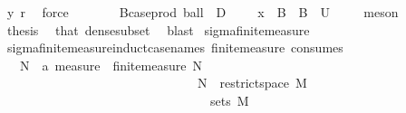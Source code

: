 \begin{isabellebody}
\ y{\isacharparenleft}{\kern0pt}{}{\isacharparenright}{\kern0pt}\ r\ \isamarkupfalse%
\ force\isanewline
\ \ \ \ \isamarkupfalse%
\ \isamarkupfalse%
\ {\isachardoublequoteopen}{\isasymexists}B{\isacharprime}{\kern0pt}{\isasymin}{\isacharparenleft}{\kern0pt}case{\isacharunderscore}{\kern0pt}prod\ ball\ {\isacharbackquote}{\kern0pt}\ {\isacharparenleft}{\kern0pt}D\ {\isasymtimes}\ {\isacharparenleft}{\kern0pt}{\isasymrat}\ {\isasyminter}\ {\isacharbraceleft}{\kern0pt}{}{\isacharless}{\kern0pt}{\isachardot}{\kern0pt}{\isachardot}{\kern0pt}{\isacharbraceright}{\kern0pt}{\isacharparenright}{\kern0pt}{\isacharparenright}{\kern0pt}{\isacharparenright}{\kern0pt}{\isachardot}{\kern0pt}\ x\ {\isasymin}\ B{\isacharprime}{\kern0pt}\ {\isasymand}\ B{\isacharprime}{\kern0pt}\ {\isasymsubseteq}\ U{\isachardoublequoteclose}\ \isamarkupfalse%
\ {\isacharasterisk}{\kern0pt}\ \isamarkupfalse%
\ meson\isanewline
\ \ \isamarkupfalse%
\isanewline
\ \ \isamarkupfalse%
\ {\isacharquery}{\kern0pt}thesis\ \isamarkupfalse%
\ that\ dense{\isacharunderscore}{\kern0pt}subset\ \isamarkupfalse%
\ blast\isanewline
{}\isamarkupfalse%
%
\endisatagproof
{\isafoldproof}%
%
\isadelimproof
\isanewline
%
\endisadelimproof
\isanewline
{}\isamarkupfalse%
\ sigma{\isacharunderscore}{\kern0pt}finite{\isacharunderscore}{\kern0pt}measure\isanewline
{}\ \ \ \ \ \ \ \ \ \isanewline
\isanewline
{}\isamarkupfalse%
\ sigma{\isacharunderscore}{\kern0pt}finite{\isacharunderscore}{\kern0pt}measure{\isacharunderscore}{\kern0pt}induct{\isacharbrackleft}{\kern0pt}case{\isacharunderscore}{\kern0pt}names\ finite{\isacharunderscore}{\kern0pt}measure{\isacharcomma}{\kern0pt}\ consumes\ {}{\isacharbrackright}{\kern0pt}{\isacharcolon}{\kern0pt}\isanewline
\ \ \ {\isachardoublequoteopen}{\isasymAnd}{\isacharparenleft}{\kern0pt}N\ {\isacharcolon}{\kern0pt}{\isacharcolon}{\kern0pt}\ {\isacharprime}{\kern0pt}a\ measure{\isacharparenright}{\kern0pt}\ {\isasymOmega}{\isachardot}{\kern0pt}\ finite{\isacharunderscore}{\kern0pt}measure\ N\ \isanewline
\ \ \ \ \ \ \ \ \ \ \ \ \ \ \ \ \ \ \ \ \ \ \ \ \ \ \ \ \ \ {\isasymLongrightarrow}\ N\ {\isacharequal}{\kern0pt}\ restrict{\isacharunderscore}{\kern0pt}space\ M\ {\isasymOmega}\isanewline
\ \ \ \ \ \ \ \ \ \ \ \ \ \ \ \ \ \ \ \ \ \ \ \ \ \ \ \ \ \ {\isasymLongrightarrow}\ {\isasymOmega}\ {\isasymin}\ sets\ M\ \isanewline

\end{isabellebody}
